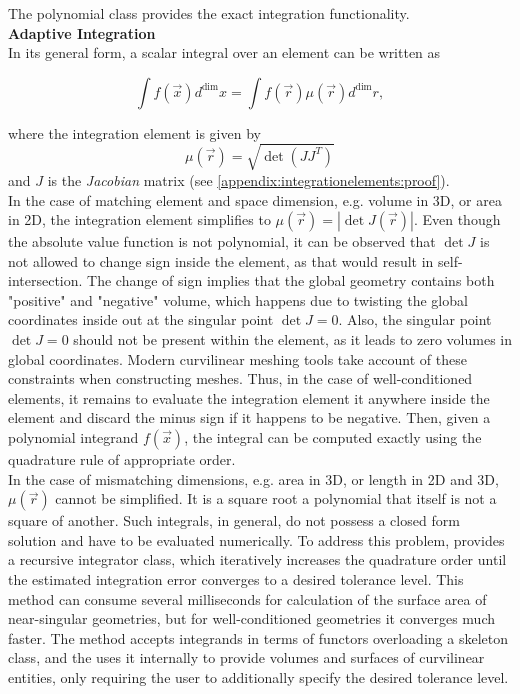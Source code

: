 \noindent
The \curvgeom{} polynomial class provides the exact integration functionality. \\




\noindent
\textbf{Adaptive Integration} \\
%
In its general form, a scalar integral over an element can be written as

\[\int f(\vec{x}) d^{\dim} x = \int f(\vec{r}) \mu(\vec{r}) d^{\dim} r,\]

\noindent
where the integration element is given by \[\mu(\vec{r}) = \sqrt{\det(J J^T)} \] and $J$ is the \textit{Jacobian} matrix (see \cref{appendix:integrationelements:proof}). \\

\noindent
In the case of matching element and space dimension, e.g. volume in 3D, or area in 2D, the integration element simplifies to $\mu(\vec{r}) = |\det J(\vec{r})|$. Even though the absolute value function is not polynomial, it can be observed that $\det J$ is not allowed to change sign inside the element, as that would result in self-intersection. The change of sign implies that the global geometry contains both "positive" and "negative" volume, which happens due to twisting the global coordinates inside out at the singular point $\det J = 0$. Also, the singular point $\det J = 0$ should not be present within the element, as it leads to zero volumes in global coordinates. Modern curvilinear meshing tools take account of these constraints when constructing meshes. Thus, in the case of well-conditioned elements, it remains to evaluate the integration element it anywhere inside the element and discard the minus sign if it happens to be negative. Then, given a polynomial integrand $f(\vec{x})$, the integral can be computed exactly using the quadrature rule of appropriate order. \\

\noindent
In the case of mismatching dimensions, e.g. area in 3D, or length in 2D and 3D, $\mu(\vec{r})$ cannot be simplified. It is a square root a polynomial that itself is not a square of another. Such integrals, in general, do not possess a closed form solution and have to be evaluated numerically. To address this problem, \curvgeom{} provides a recursive integrator class, which iteratively increases the quadrature order until the estimated integration error converges to a desired tolerance level. This method can consume several milliseconds for calculation of the surface area of near-singular geometries, but for well-conditioned geometries it converges much faster. The method accepts integrands in terms of functors overloading a skeleton class, and the \curvgeom{} uses it internally to provide volumes and surfaces of curvilinear entities, only requiring the user to additionally specify the desired tolerance level. \\

